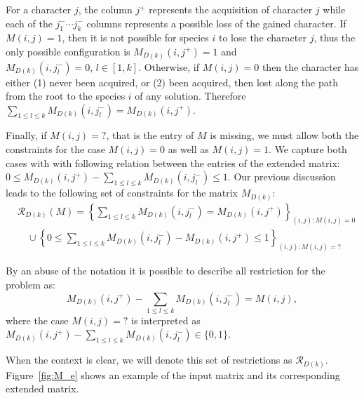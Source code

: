 \documentclass[a4paper,USenglish]{article}
\theoremstyle{definition}
\begin{document}
For a character $j$, the column $j^{+}$ represents the acquisition of
  character $j$ while each of the  $j^{-}_{1} \cdots j^{-}_{k}$ columns represents a
  possible loss of the gained character.
If  $M(i,j)=1$, then it is  not possible for species $i$ to lose the
character $j$, thus the  only possible  configuration is  $M_{D(k)}(i,j^{+})=1$ and
$M_{D(k)}(i,j^{-}_l)=0,\, l\in [1,k]$. 
Otherwise, if $M(i,j)=0$ then the character has either (1) never been acquired, or (2) been
acquired, then lost along the path from the root to the species $i$ of any solution.
%
Therefore $ \sum_{1\le l\le
  k}M_{D(k)}(i,j^{-}_l)=M_{D(k)}(i,j^{+})$. 

Finally, if $M(i,j)=?$, that is the entry of $M$ is missing,  we must allow both the
constraints for the case $M(i,j)=0$ as well as $M(i,j)=1$.
%
We capture both cases with with following relation
between the entries of the extended matrix:
$ 0\le M_{D(k)}(i,j^{+}) - \sum_{1\le l\le k}M_{D(k)}(i,j^{-}_l)\le 1$.
Our previous discussion  leads to the  following set  of constraints for  the matrix
$M_{D(k)}$:
{\small \begin{align} \label{eq:R_Dk}
&\mathcal{R}_{D(k)}(M)=\left\{\sum\limits_{1\le l\le k}M_{D(k)}(i,j^{-}_l)=
  M_{D(k)}(i,j^{+})\right\}_{(i,j): M(i,j)=0} \nonumber\\
&\quad \cup \left\{0 \le\sum\limits_{1\le l\le k}M_{D(k)}(i,j^{-}_l)-
  M_{D(k)}(i,j^{+})\le 1\right\}_{(i,j): M(i,j)=?}
\end{align}
}  

By an abuse of the notation it is possible to describe all restriction for the problem as:
\begin{equation}\label{eq:Dk2}
  M_{D(k)}(i,j^{+}) - \sum_{1\le l\le k}M_{D(k)}(i,j^{-}_l)= M(i,j),
\end{equation}
where the case $M(i,j)=?$ is interpreted as $M_{D(k)}(i,j^{+}) - \sum_{1\le l\le k}M_{D(k)}(i,j^{-}_l)\in \{0,1\} $.

When  the  context  is  clear,  we  will denote  this  set  of  restrictions  as
$\mathcal{R}_{D(k)}$. 
Figure~\ref{fig:M_e} shows an example of the input matrix and its
corresponding extended matrix.
\end{document}
